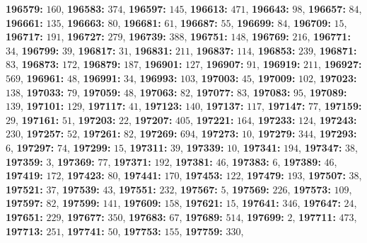 \textsf{\bfseries 196579:} $160$, \textsf{\bfseries 196583:} $374$, \textsf{\bfseries 196597:} $145$, \textsf{\bfseries 196613:} $471$, \textsf{\bfseries 196643:} $98$, \textsf{\bfseries 196657:} $84$, \textsf{\bfseries 196661:} $135$, \textsf{\bfseries 196663:} $80$, \textsf{\bfseries 196681:} $61$, \textsf{\bfseries 196687:} $55$, \textsf{\bfseries 196699:} $84$, \textsf{\bfseries 196709:} $15$, \textsf{\bfseries 196717:} $191$, \textsf{\bfseries 196727:} $279$, \textsf{\bfseries 196739:} $388$, \textsf{\bfseries 196751:} $148$, \textsf{\bfseries 196769:} $216$, \textsf{\bfseries 196771:} $34$, \textsf{\bfseries 196799:} $39$, \textsf{\bfseries 196817:} $31$, \textsf{\bfseries 196831:} $211$, \textsf{\bfseries 196837:} $114$, \textsf{\bfseries 196853:} $239$, \textsf{\bfseries 196871:} $83$, \textsf{\bfseries 196873:} $172$, \textsf{\bfseries 196879:} $187$, \textsf{\bfseries 196901:} $127$, \textsf{\bfseries 196907:} $91$, \textsf{\bfseries 196919:} $211$, \textsf{\bfseries 196927:} $569$, \textsf{\bfseries 196961:} $48$, \textsf{\bfseries 196991:} $34$, \textsf{\bfseries 196993:} $103$, \textsf{\bfseries 197003:} $45$, \textsf{\bfseries 197009:} $102$, \textsf{\bfseries 197023:} $138$, \textsf{\bfseries 197033:} $79$, \textsf{\bfseries 197059:} $48$, \textsf{\bfseries 197063:} $82$, \textsf{\bfseries 197077:} $83$, \textsf{\bfseries 197083:} $95$, \textsf{\bfseries 197089:} $139$, \textsf{\bfseries 197101:} $129$, \textsf{\bfseries 197117:} $41$, \textsf{\bfseries 197123:} $140$, \textsf{\bfseries 197137:} $117$, \textsf{\bfseries 197147:} $77$, \textsf{\bfseries 197159:} $29$, \textsf{\bfseries 197161:} $51$, \textsf{\bfseries 197203:} $22$, \textsf{\bfseries 197207:} $405$, \textsf{\bfseries 197221:} $164$, \textsf{\bfseries 197233:} $124$, \textsf{\bfseries 197243:} $230$, \textsf{\bfseries 197257:} $52$, \textsf{\bfseries 197261:} $82$, \textsf{\bfseries 197269:} $694$, \textsf{\bfseries 197273:} $10$, \textsf{\bfseries 197279:} $344$, \textsf{\bfseries 197293:} $6$, \textsf{\bfseries 197297:} $74$, \textsf{\bfseries 197299:} $15$, \textsf{\bfseries 197311:} $39$, \textsf{\bfseries 197339:} $10$, \textsf{\bfseries 197341:} $194$, \textsf{\bfseries 197347:} $38$, \textsf{\bfseries 197359:} $3$, \textsf{\bfseries 197369:} $77$, \textsf{\bfseries 197371:} $192$, \textsf{\bfseries 197381:} $46$, \textsf{\bfseries 197383:} $6$, \textsf{\bfseries 197389:} $46$, \textsf{\bfseries 197419:} $172$, \textsf{\bfseries 197423:} $80$, \textsf{\bfseries 197441:} $170$, \textsf{\bfseries 197453:} $122$, \textsf{\bfseries 197479:} $193$, \textsf{\bfseries 197507:} $38$, \textsf{\bfseries 197521:} $37$, \textsf{\bfseries 197539:} $43$, \textsf{\bfseries 197551:} $232$, \textsf{\bfseries 197567:} $5$, \textsf{\bfseries 197569:} $226$, \textsf{\bfseries 197573:} $109$, \textsf{\bfseries 197597:} $82$, \textsf{\bfseries 197599:} $141$, \textsf{\bfseries 197609:} $158$, \textsf{\bfseries 197621:} $15$, \textsf{\bfseries 197641:} $346$, \textsf{\bfseries 197647:} $24$, \textsf{\bfseries 197651:} $229$, \textsf{\bfseries 197677:} $350$, \textsf{\bfseries 197683:} $67$, \textsf{\bfseries 197689:} $514$, \textsf{\bfseries 197699:} $2$, \textsf{\bfseries 197711:} $473$, \textsf{\bfseries 197713:} $251$, \textsf{\bfseries 197741:} $50$, \textsf{\bfseries 197753:} $155$, \textsf{\bfseries 197759:} $330$, 
